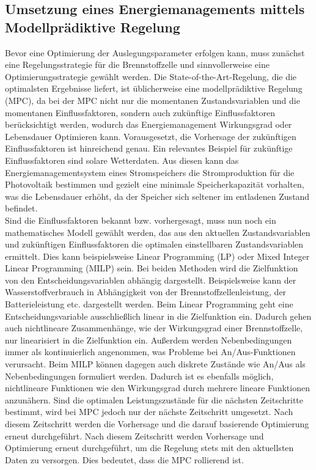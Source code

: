 

\subsection{Umsetzung eines Energiemanagements mittels Modellprädiktive Regelung}
Bevor eine Optimierung der Auslegungsparameter erfolgen kann, muss zunächst eine Regelungsstrategie für die Brennstoffzelle und sinnvollerweise eine Optimierungsstrategie gewählt werden. 
Die State-of-the-Art-Regelung, die die optimalsten Ergebnisse liefert, ist üblicherweise eine modellprädiktive Regelung (MPC), da bei der MPC nicht nur die momentanen Zustandsvariablen und die momentanen Einflussfaktoren, sondern auch zukünftige Einflussfaktoren berücksichtigt werden, wodurch das Energiemanagement Wirkungsgrad oder Lebensdauer Optimieren kann. Vorausgesetzt, die Vorhersage der zukünftigen Einflussfaktoren ist hinreichend genau. Ein relevantes Beispiel für zukünftige Einflussfaktoren sind solare Wetterdaten. Aus diesen kann das Energiemanagementsystem eines Stromspeichers die Stromproduktion für die Photovoltaik bestimmen und gezielt eine minimale Speicherkapazität vorhalten, was die Lebensdauer erhöht, da der Speicher sich seltener im entladenen Zustand befindet. \\ 
Sind die Einflussfaktoren bekannt bzw. vorhergesagt, muss nun noch ein mathematisches Modell gewählt werden, das aus den aktuellen Zustandsvariablen und zukünftigen Einflussfaktoren die optimalen einstellbaren Zustandsvariablen ermittelt. Dies kann beispielsweise Linear Programming (LP) oder Mixed Integer Linear Programming (MILP) sein. Bei beiden Methoden wird die Zielfunktion von den Entscheidungsvariablen abhängig dargestellt. Beispielsweise kann der Wasserstoffverbrauch in Abhängigkeit von der Brennstoffzellenleistung, der Batterieleistung etc. dargestellt werden. Beim Linear Programming geht eine Entscheidungsvariable ausschließlich linear in die Zielfunktion ein. Dadurch gehen auch nichtlineare Zusammenhänge, wie der Wirkungsgrad einer Brennstoffzelle, nur linearisiert in die Zielfunktion ein. Außerdem werden Nebenbedingungen immer als kontinuierlich angenommen, was Probleme bei An/Aus-Funktionen verursacht. Beim MILP können dagegen auch diskrete Zustände wie An/Aus als Nebenbedingungen formuliert werden. Dadurch ist es ebenfalls möglich, nichtlineare Funktionen wie den Wirkungsgrad durch mehrere lineare Funktionen anzunähern. Sind die optimalen Leistungszustände für die nächsten Zeitschritte bestimmt, wird bei MPC jedoch nur der nächste Zeitschritt umgesetzt. Nach diesem Zeitschritt werden die Vorhersage und die darauf basierende Optimierung erneut durchgeführt. Nach diesem Zeitschritt werden Vorhersage und Optimierung erneut durchgeführt, um die Regelung stets mit den aktuellsten Daten zu versorgen. Dies bedeutet, dass die MPC rollierend ist. \\

